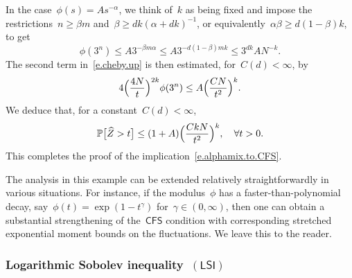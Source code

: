 \documentclass[11pt,twoside]{article} %
\numberwithin{equation}{section}
\theoremstyle{definition}
\renewcommand*{\hat}{\widehat}
\renewcommand{\P}{\mathbb{P}}
\newcommand{\CFS}{\mathsf{CFS}}
\newcommand{\LSI}{\mathsf{LSI}}
\begin{document}
\smallskip

In the case~$\phi(s) = As^{-\alpha}$, we think of~$k$ as being fixed and impose the restrictions~$n \geq \beta m$ and~$\beta \geq dk( \alpha+dk)^{-1}$, or equivalently~$\alpha \beta \geq d(1-\beta) k$, to get
\begin{equation*} \label{}
\phi(3^n ) 
\leq 
A 3^{-\beta m\alpha} 
\leq 
A 3^{-d(1-\beta)  mk} 
\leq 
3^{dk} A N^{-k}. 
\end{equation*}
The second term  in~\eqref{e.cheby.up} is then estimated, for~$C(d)<\infty$, by
\begin{align*}
4 \Bigl( \frac{4N}{t} \Bigr)^{2k} \phi(3^n)
\leq
A \Bigl( \frac{C N}{t^2} \Bigr)^{k}. 
\end{align*}
We deduce that, for a constant~$C(d)<\infty$,
\begin{equation*} \label{}
\P \bigl[ \hat{Z} > t \bigr] 
\leq 
(1+A) \Bigl( \frac{CkN}{t^2} \Bigr)^{k}, \quad \forall t>0. 
\end{equation*}
This completes the proof of the implication~\eqref{e.alphamix.to.CFS}.

\smallskip

The analysis in this example can be extended relatively straightforwardly in various situations. 
For instance, if the modulus~$\phi$ has a faster-than-polynomial decay, say~$\phi(t) = \exp( 1 - t^{\gamma} )$ for~$\gamma\in(0,\infty)$, then one can obtain a substantial strengthening of the~$\CFS$ condition with corresponding stretched exponential moment bounds on the fluctuations. We leave this to the reader. 










\subsubsection{Logarithmic Sobolev inequality~$(\LSI)$}
\label{ss.LSI}
\end{document}
